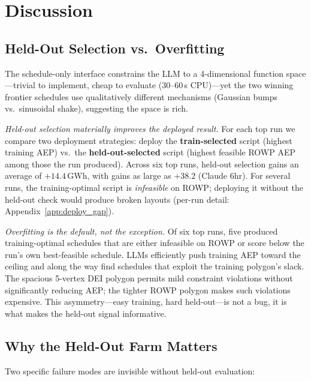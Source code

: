 \section{Discussion}
\label{sec:discussion}

\subsection{Held-Out Selection vs.\ Overfitting}
\label{sec:overfit}

The schedule-only interface constrains the LLM to a 4-dimensional
function space---trivial to implement, cheap to evaluate
(30--60\,s CPU)---yet the two winning frontier schedules use
qualitatively different mechanisms (Gaussian bumps vs.\ sinusoidal
shake), suggesting the space is rich.

\emph{Held-out selection materially improves the deployed result.}
For each top run we compare two deployment strategies: deploy the
\textbf{train-selected} script (highest training AEP) vs.\ the
\textbf{held-out-selected} script (highest feasible ROWP AEP among
those the run produced). Across six top runs, held-out selection
gains an average of $+14.4$\,GWh, with gains as large as $+38.2$
(Claude 6hr). For several runs, the training-optimal script is
\emph{infeasible} on ROWP; deploying it without the held-out check
would produce broken layouts (per-run detail:
Appendix~\ref{app:deploy_gap}).

\emph{Overfitting is the default, not the exception.} Of six top
runs, five produced training-optimal schedules that are either
infeasible on ROWP or score below the run's own best-feasible
schedule. LLMs efficiently push training AEP toward the ceiling
and along the way find schedules that exploit the training
polygon's slack. The spacious 5-vertex DEI polygon permits mild
constraint violations without significantly reducing AEP; the
tighter ROWP polygon makes such violations expensive. This
asymmetry---easy training, hard held-out---is not a bug, it is
what makes the held-out signal informative.

\subsection{Why the Held-Out Farm Matters}

Two specific failure modes are invisible without held-out evaluation:


